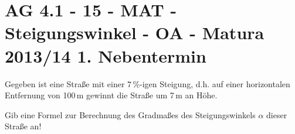 \section{AG 4.1 - 15 - MAT - Steigungswinkel - OA - Matura 2013/14 1. Nebentermin}

\begin{beispiel}[AG 4.1]{1} %
				Gegeben ist eine Straße mit einer $7\,\%$-igen Steigung, d.h. auf einer horizontalen Entfernung von 100\,m gewinnt die Straße um 7\,m an Höhe.
				
				Gib eine Formel zur Berechnung des Gradmaßes des Steigungswinkels $\alpha$ dieser Straße an!
				
\end{beispiel}